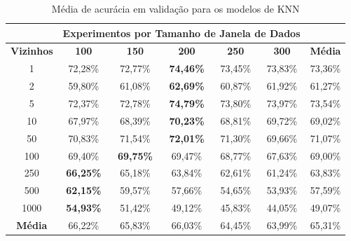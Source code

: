 \begin{table}[H]
\scriptsize
\centering
\caption{Média de acurácia em validação para os modelos de KNN} 
\label{table:knn_results_tipo_superficie_1}
\begin{tabular}{ccccccc}
\cmidrule(lr){2-6}
& \multicolumn{5}{c}{\textbf{Experimentos por Tamanho de Janela de Dados}} & \multicolumn{1}{c}{} \\ \midrule
\textbf{Vizinhos} & \textbf{100} & \textbf{150} & \textbf{200} & \textbf{250} & \textbf{300} & \textbf{Média} \\ \midrule
1 & 72,28\% & 72,77\% & \textbf{74,46\%} & 73,45\% & 73,83\% & 73,36\% \\ \midrule
2 & 59,80\% & 61,08\% & \textbf{62,69\%} & 60,87\% & 61,92\% & 61,27\% \\ \midrule
5 & 72,37\% & 72,78\% & \cellcolor[HTML]{34FF34}\textbf{74,79\%} & 73,80\% & 73,97\% & 73,54\% \\ \midrule
10 & 67,97\% & 68,39\% & \textbf{70,23\%} & 68,81\% & 69,72\% & 69,02\% \\ \midrule
50 & 70,83\% & 71,54\% & \textbf{72,01\%} & 71,30\% & 69,66\% & 71,07\% \\ \midrule
100 & 69,40\% & \textbf{69,75\%} & 69,47\% & 68,77\% & 67,63\% & 69,00\% \\ \midrule
250 & \textbf{66,25\%} & 65,18\% & 63,84\% & 62,61\% & 61,24\% & 63,83\%\\ \midrule
500 & \textbf{62,15\%} & 59,57\% & 57,66\% & 54,65\% & 53,93\% & 57,59\% \\ \midrule
1000 & \textbf{54,93\%} & 51,42\% & 49,12\% & 45,83\% & 44,05\% & 49,07\% \\ \midrule
\textbf{Média} & 66,22\% & 65,83\% & 66,03\% & 64,45\% & 63,99\% & 65,31\% \\ \bottomrule
\end{tabular}
\end{table}

